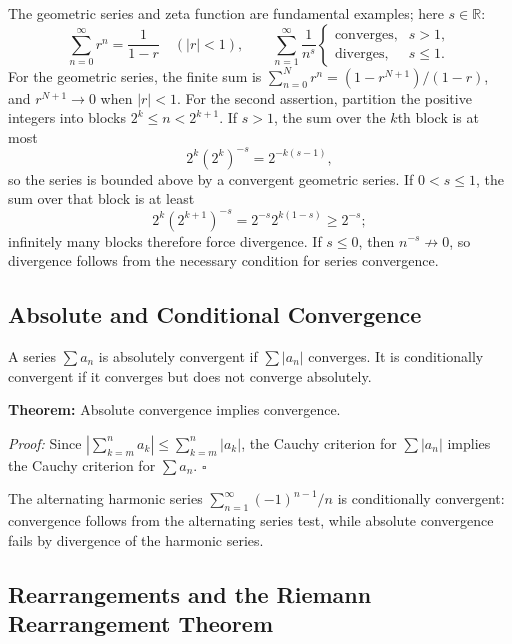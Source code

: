 \documentclass[a4paper,11pt,abstracton]{scrartcl}
\newcommand{\RR}{\mathbb{R}}
\theoremstyle{dotlessP}
\theoremstyle{dotlessS}
\theoremstyle{remark}
\theoremstyle{definition}
\begin{document}
The geometric series and zeta function are fundamental examples; here
$s\in\RR$:
\[
 \sum_{n=0}^{\infty}r^n=\frac1{1-r}\quad(|r|<1),
 \qquad
 \sum_{n=1}^{\infty}\frac1{n^s}
 \begin{cases}
  \text{converges},&s>1,\\
  \text{diverges},&s\le1.
 \end{cases}
\]
For the geometric series, the finite sum is
$\sum_{n=0}^N r^n=(1-r^{N+1})/(1-r)$, and $r^{N+1}\to0$ when
$|r|<1$. For the second assertion, partition the positive integers
into blocks $2^k\le n<2^{k+1}$. If $s>1$, the sum over the $k$th
block is at most
\[
    2^k(2^k)^{-s}=2^{-k(s-1)},
\]
so the series is bounded above by a convergent geometric series. If
$0<s\le1$, the sum over that block is at least
\[
    2^k(2^{k+1})^{-s}=2^{-s}2^{k(1-s)}\ge2^{-s};
\]
infinitely many blocks therefore force divergence. If $s\le0$, then
$n^{-s}\not\to0$, so divergence follows from the necessary condition
for series convergence.

\subsection{Absolute and Conditional Convergence}

\begin{definition_box}
A series $\sum a_n$ is absolutely convergent if
$\sum|a_n|$ converges. It is conditionally convergent if it converges
but does not converge absolutely.
\end{definition_box}

\begin{problem_box}
\textbf{Theorem:} Absolute convergence implies convergence.
\end{problem_box}

\begin{claim_box}
\textit{Proof:} Since
$|\sum_{k=m}^n a_k|\le\sum_{k=m}^n|a_k|$, the Cauchy criterion
for $\sum|a_n|$ implies the Cauchy criterion for $\sum a_n$.
\hfill$\square$
\end{claim_box}

The alternating harmonic series
$\sum_{n=1}^{\infty}(-1)^{n-1}/n$ is conditionally convergent:
convergence follows from the alternating series test, while absolute
convergence fails by divergence of the harmonic series.

\subsection{Rearrangements and the Riemann Rearrangement Theorem}
\end{document}

